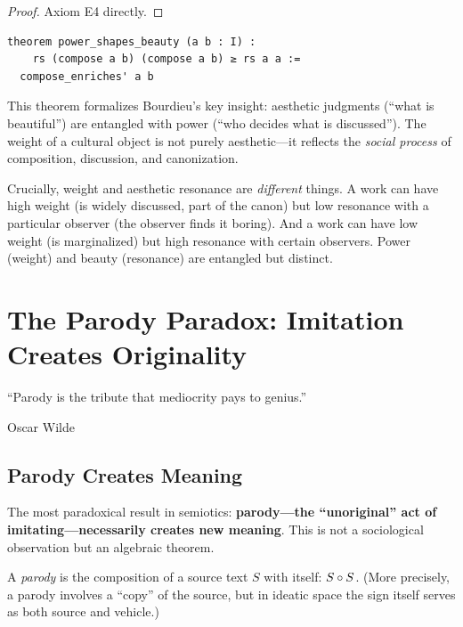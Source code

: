 \begin{proof}
Axiom E4 directly.
\end{proof}

\begin{lstlisting}
theorem power_shapes_beauty (a b : I) :
    rs (compose a b) (compose a b) ≥ rs a a :=
  compose_enriches' a b
\end{lstlisting}

\begin{interpretation}
This theorem formalizes Bourdieu's key insight: aesthetic judgments
(``what is beautiful'') are entangled with power (``who decides what
is discussed'').  The weight of a cultural object is not purely aesthetic---it
reflects the \emph{social process} of composition, discussion, and
canonization.

Crucially, weight and aesthetic resonance are \emph{different} things.
A work can have high weight (is widely discussed, part of the canon)
but low resonance with a particular observer (the observer finds it
boring).  And a work can have low weight (is marginalized) but high
resonance with certain observers.  Power (weight) and beauty (resonance)
are entangled but distinct.
\end{interpretation}



\chapter{The Parody Paradox: Imitation Creates Originality}
\label{ch:parody}

\epigraph{``Parody is the tribute that mediocrity pays to genius.''}{Oscar Wilde}

\section{Parody Creates Meaning}

The most paradoxical result in semiotics: \textbf{parody---the
``unoriginal'' act of imitating---necessarily creates new meaning}.
This is not a sociological observation but an algebraic theorem.

\begin{definition}[Parody]
A \emph{parody} is the composition of a source text $S$ with itself:
$S \circ S$.  (More precisely, a parody involves a ``copy'' of
the source, but in ideatic space the sign itself serves as both source
and vehicle.)
\end{definition}

